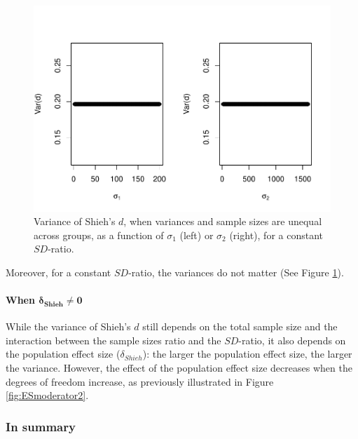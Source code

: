 \documentclass[
  english,
  man,mask]{apa6}
\let\oldparagraph\paragraph
\renewcommand{\paragraph}[1]{\oldparagraph{#1}\mbox{}}
\begin{document}
\begin{figure}
\centering
\includegraphics{Theoretical-Variance-of-all-estimators-as-a-function-of-population-parameters_files/figure-latex/varshiehhetunbalvariance2-1.pdf}
\caption{\label{fig:varshiehhetunbalvariance2}Variance of Shieh's \(d\), when variances and sample sizes are unequal across groups, as a function of \(\sigma_1\) (left) or \(\sigma_2\) (right), for a constant \(SD\)-ratio.}
\end{figure}

Moreover, for a constant \(SD\)-ratio, the variances do not matter (See Figure \ref{fig:varshiehhetunbalvariance2}).

\hypertarget{when-bmdelta_shieh-neq-0-2}{%
\paragraph{\texorpdfstring{When \(\bm{\delta_{Shieh} \neq 0}\)}{When \textbackslash bm\{\textbackslash delta\_\{Shieh\} \textbackslash neq 0\}}}\label{when-bmdelta_shieh-neq-0-2}}

While the variance of Shieh's \(d\) still depends on the total sample size and the interaction between the sample sizes ratio and the \(SD\)-ratio, it also depends on the population effect size (\(\delta_{Shieh}\)): the larger the population effect size, the larger the variance. However, the effect of the population effect size decreases when the degrees of freedom increase, as previously illustrated in Figure \ref{fig:ESmoderator2}.

\hypertarget{in-summary-3}{%
\subsubsection{In summary}\label{in-summary-3}}
\end{document}
